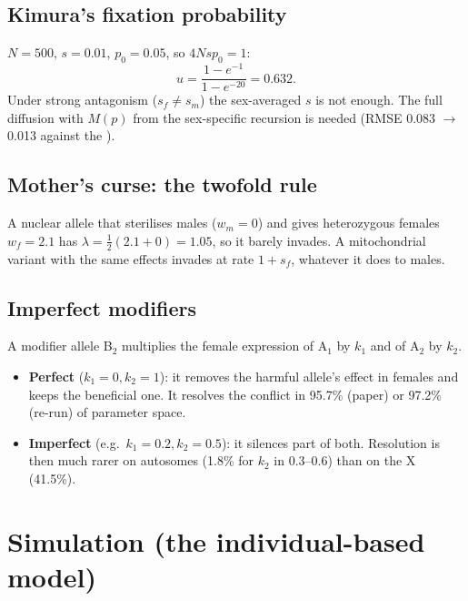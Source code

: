 \subsection{Kimura's fixation probability}
$N=500$, $s=0.01$, $p_0=0.05$, so $4Nsp_0=1$:
\[
u=\frac{1-e^{-1}}{1-e^{-20}}=0.632.
\]
Under strong antagonism ($s_f\ne s_m$) the sex-averaged $s$ is not enough. The full diffusion with $M(p)$ from the sex-specific recursion is needed (RMSE 0.083 $\to$ 0.013 against the \IBM).

\subsection{Mother's curse: the twofold rule}
A nuclear allele that sterilises males ($w_m=0$) and gives heterozygous females $w_f=2.1$ has $\lambda=\tfrac12(2.1+0)=1.05$, so it barely invades. A mitochondrial variant with the same effects invades at rate $1+s_f$, whatever it does to males.

\subsection{Imperfect modifiers}
A modifier allele B$_2$ multiplies the female expression of A$_1$ by $k_1$ and of A$_2$ by $k_2$.
\begin{itemize}
\item \textbf{Perfect} ($k_1=0,k_2=1$): it removes the harmful allele's effect in females and keeps the beneficial one. It resolves the conflict in 95.7\% (paper) or 97.2\% (re-run) of parameter space.
\item \textbf{Imperfect} (e.g.\ $k_1=0.2,k_2=0.5$): it silences part of both. Resolution is then much rarer on autosomes (1.8\% for $k_2$ in 0.3--0.6) than on the X (41.5\%).
\end{itemize}

\section{Simulation (the individual-based model)}
